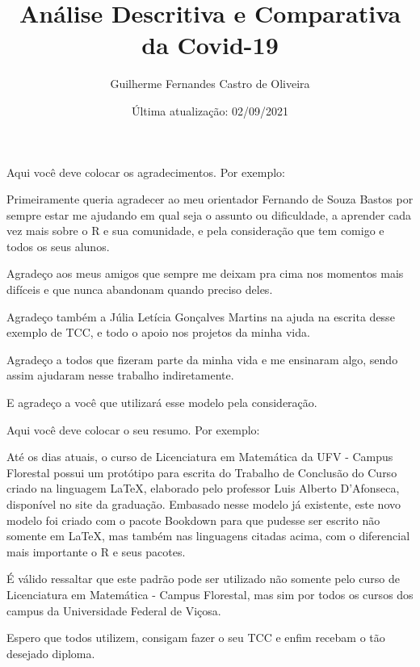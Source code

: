 \documentclass[
  fleqn,ebook]{ic}
\title{Análise Descritiva e Comparativa da Covid-19}
\author{Guilherme Fernandes Castro de Oliveira}
\date{Última atualização: 02/09/2021}
\renewcommand\maketitle{}
\begin{document}
\maketitle

\begin{acknowledgement}

  Aqui você deve colocar os agradecimentos. Por exemplo:
  
  Primeiramente queria agradecer ao meu orientador Fernando de Souza Bastos por
  sempre estar me ajudando em qual seja o assunto ou dificuldade, a aprender
  cada vez mais sobre o R e sua comunidade, e pela consideração que tem comigo e
  todos os seus alunos.
  
  Agradeço aos meus amigos que sempre me deixam pra cima nos momentos mais
  difíceis e que nunca abandonam quando preciso deles.

  Agradeço também a Júlia Letícia Gonçalves Martins na ajuda na escrita desse
  exemplo de TCC, e todo o apoio nos projetos da minha vida.
  
  Agradeço a todos que fizeram parte da minha vida e me ensinaram algo, sendo
  assim ajudaram nesse trabalho indiretamente.
  
  E agradeço a você que utilizará esse modelo pela consideração.

\end{acknowledgement}
\begin{Resumo}
  
  Aqui você deve colocar o seu resumo. Por exemplo:
  
  Até os dias atuais, o curso de Licenciatura em Matemática da UFV - Campus 
  Florestal possui um protótipo para escrita do Trabalho de Conclusão do Curso
  criado na linguagem LaTeX, elaborado pelo professor Luis Alberto D'Afonseca, 
  disponível no site da graduação. Embasado nesse modelo já existente, este novo
  modelo foi criado com o pacote Bookdown para que pudesse ser escrito não 
  somente em LaTeX, mas também nas linguagens citadas acima, com o diferencial 
  mais importante o R e seus pacotes.
  
  É válido ressaltar que este padrão pode ser utilizado não somente pelo curso
  de Licenciatura em Matemática - Campus Florestal, mas sim por todos os cursos
  dos campus da Universidade Federal de Viçosa.
  
  Espero que todos utilizem, consigam fazer o seu TCC e enfim recebam o tão
  desejado diploma.
  
\end{Resumo}
\end{document}
